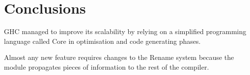 \section{Conclusions}

\begin{conclusion}
GHC managed to improve its scalability by relying on a simplified programming language called Core in optimisation and code generating phases.
\end{conclusion}

\begin{conclusion}
Almost any new feature requires changes to the Rename system because the module propagates pieces of information to the rest of the compiler.
\end{conclusion}

